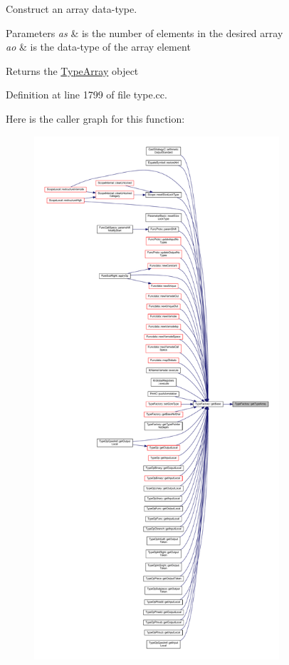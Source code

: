 Construct an array data-\/type. 


\begin{DoxyParams}{Parameters}
{\em as} & is the number of elements in the desired array \\
\hline
{\em ao} & is the data-\/type of the array element \\
\hline
\end{DoxyParams}
\begin{DoxyReturn}{Returns}
the \mbox{\hyperlink{class_type_array}{Type\+Array}} object 
\end{DoxyReturn}


Definition at line 1799 of file type.\+cc.

Here is the caller graph for this function\+:
\nopagebreak
\begin{figure}[H]
\begin{center}
\leavevmode
\includegraphics[height=550pt]{class_type_factory_ad1efe412493c66b6072ae0def3b53004_icgraph}
\end{center}
\end{figure}
\mbox{\label{class_type_factory_a47c3d70d9598d2b4ce3770593f6ce97e}} 
